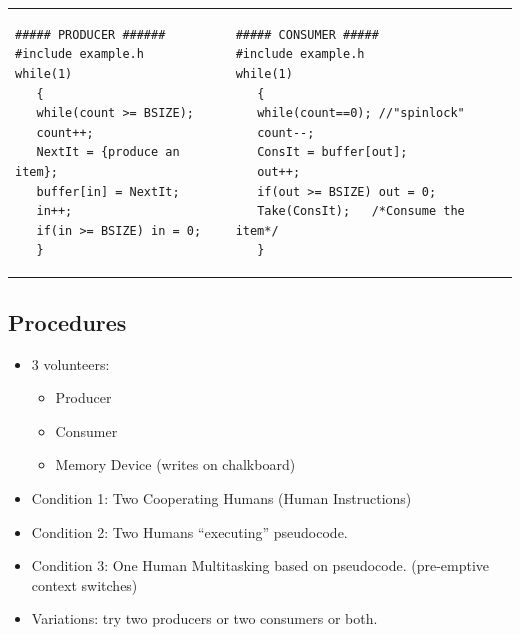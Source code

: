

\begin{tabular}{p{2in}p{2in}}

\begin{verbatim}
##### PRODUCER ######
#include example.h
while(1)
   {
   while(count >= BSIZE);
   count++;
   NextIt = {produce an item};
   buffer[in] = NextIt;
   in++;
   if(in >= BSIZE) in = 0;
   }
\end{verbatim}

&

\begin{verbatim}
##### CONSUMER #####
#include example.h
while(1)
   {
   while(count==0); //"spinlock"
   count--;
   ConsIt = buffer[out];
   out++;
   if(out >= BSIZE) out = 0;
   Take(ConsIt);   /*Consume the item*/
   }
\end{verbatim}
\end{tabular}


\subsection{Procedures}

\begin{itemize}
        \item 3 volunteers:
        \begin{itemize}
                \item Producer
                \item Consumer
                \item Memory Device (writes on chalkboard)
        \end{itemize}
        \item Condition 1: Two Cooperating Humans
                (Human Instructions)
        \item Condition 2: Two Humans ``executing''
                pseudocode.
        \item Condition 3: One Human Multitasking based
                on pseudocode. (pre-emptive context switches)
        \item Variations:  try two producers or two consumers
        or both.

\end{itemize}

